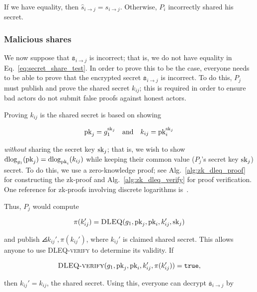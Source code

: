 \noindent
If we have equality, then $\hat{s}_{i\to j} = s_{i\to j}$.
Otherwise, $P_{i}$ incorrectly shared his secret.



\subsubsection{Malicious shares}

We now suppose that $\overline{\texttt{s}}_{i\to j}$ is incorrect;
that is, we do not have equality in Eq.~\eqref{eq:secret_share_test}.
In order to prove this to be the case, everyone needs to be
able to prove that the encrypted secret
$\overline{\texttt{s}}_{i\to j}$ is incorrect.
To do this, $P_{j}$ must publish and prove the shared secret $k_{ij}$;
this is required in order to ensure bad actors
do not submit false proofs against honest actors.

Proving $k_{ij}$ is the shared secret is based on showing

\begin{equation}
    \textrm{pk}_{j} = g_{1}^{\textrm{sk}_{j}} \quad\text{and}\quad
    k_{ij} = \textrm{pk}_{i}^{\textrm{sk}_{j}}
\end{equation}

\noindent
\emph{without} sharing the secret key $\textrm{sk}_{j}$;
that is, we wish to show
$\operatorname{dlog}_{g_{1}}(\textrm{pk}_{j}) = \operatorname{dlog}_{\textrm{pk}_{i}}(k_{ij})$
while keeping their common value ($P_{j}$'s secret key $\textrm{sk}_{j}$) secret.
To do this, we use a zero-knowledge proof;
see Alg.~\ref{alg:zk_dleq_proof} for constructing the zk-proof
and Alg.~\ref{alg:zk_dleq_verify} for proof verification.
One reference for zk-proofs involving discrete logarithms
is~\cite{camenisch1997proof}.

Thus, $P_{j}$ would compute

\begin{equation}
    \pi(k_{ij}') = \textsc{DLEQ}(g_{1},\textrm{pk}_{j},\textrm{pk}_{i},k_{ij}',\textrm{sk}_{j})
\end{equation}

\noindent
and publish $\angles{k_{ij}',\pi(k_{ij}')}$, where $k_{ij}'$
is claimed shared secret.
This allows anyone to use \textsc{DLEQ-verify} to determine
its validity.
If

\begin{equation}
    \textsc{DLEQ-verify}(g_{1},\textrm{pk}_{j},\textrm{pk}_{i},k_{ij}',\pi(k_{ij}'))
        = \texttt{true},
\end{equation}

\noindent
then $k_{ij}' = k_{ij}$, the shared secret.
Using this, everyone can decrypt $\overline{\texttt{s}}_{i\to j}$
by

